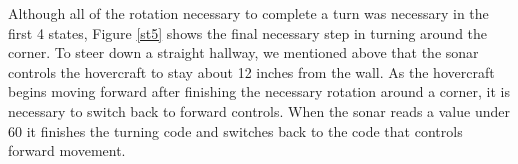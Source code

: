 Although all of the rotation necessary to complete a turn was necessary in the first 4 states, Figure \ref{st5} shows the final necessary step in turning around the corner. To steer down a straight hallway, we mentioned above that the sonar controls the hovercraft to stay about 12 inches from the wall. As the hovercraft begins moving forward after finishing the necessary rotation around a corner, it is necessary to switch back to forward controls. When the sonar reads a value under 60 it finishes the turning code and switches back to the code that controls forward movement.
